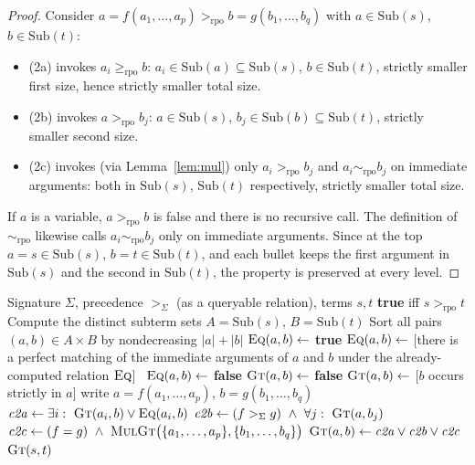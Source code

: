 \documentclass{amsart}
\theoremstyle{definition}
\theoremstyle{remark}
\newcommand{\rpo}{>_{\mathrm{rpo}}}
\newcommand{\rpoe}{\ge_{\mathrm{rpo}}}
\newcommand{\sig}{\Sigma}
\newcommand{\prc}{>_{\sig}}
\newcommand{\size}[1]{|#1|}
\begin{document}
\begin{proof}
Consider $a=f(a_1,\dots,a_p)\rpo b=g(b_1,\dots,b_q)$ with $a\in\mathrm{Sub}(s)$,
$b\in\mathrm{Sub}(t)$:
\begin{itemize}
\item (2a) invokes $a_i\rpoe b$: $a_i\in\mathrm{Sub}(a)\subseteq\mathrm{Sub}(s)$,
$b\in\mathrm{Sub}(t)$, strictly smaller first size, hence strictly smaller total
size.
\item (2b) invokes $a\rpo b_j$: $a\in\mathrm{Sub}(s)$,
$b_j\in\mathrm{Sub}(b)\subseteq\mathrm{Sub}(t)$, strictly smaller second size.
\item (2c) invokes (via Lemma~\ref{lem:mul}) only $a_i\rpo b_j$ and
$a_i\sim_{\mathrm{rpo}}b_j$ on immediate arguments: both in $\mathrm{Sub}(s)$,
$\mathrm{Sub}(t)$ respectively, strictly smaller total size.
\end{itemize}
If $a$ is a variable, $a\rpo b$ is false and there is no recursive call. The
definition of $\sim_{\mathrm{rpo}}$ likewise calls $a_i\sim_{\mathrm{rpo}}b_j$
only on immediate arguments. Since at the top $a=s\in\mathrm{Sub}(s)$,
$b=t\in\mathrm{Sub}(t)$, and each bullet keeps the first argument in
$\mathrm{Sub}(s)$ and the second in $\mathrm{Sub}(t)$, the property is preserved
at every level.
\end{proof}

\begin{algorithm}
\caption{{\sc RPO-Compare}: decide $s\rpo t$}
\begin{algorithmic}[1]
\Require Signature $\sig$, precedence $\prc$ (as a queryable relation), terms $s,t$
\Ensure \textbf{true} iff $s\rpo t$
\State Compute the distinct subterm sets $A=\mathrm{Sub}(s)$, $B=\mathrm{Sub}(t)$
\State Sort all pairs $(a,b)\in A\times B$ by nondecreasing $\size{a}+\size{b}$
  \State {}
   $\textsc{Eq}(a,b)\gets$ \textbf{true}
     \State $\textsc{Eq}(a,b)\gets$ [there is a perfect matching of the immediate
     arguments of $a$ and $b$ under the already-computed relation $\textsc{Eq}$]
  \Else\ $\textsc{Eq}(a,b)\gets$ \textbf{false}
  \EndIf
  \State \Comment{$\textsc{Gt}(a,b)=[a\rpo b]$}
   $\textsc{Gt}(a,b)\gets$ \textbf{false}
   $\textsc{Gt}(a,b)\gets$ [$b$ occurs strictly in $a$]
  \Else
     \State write $a=f(a_1,\dots,a_p)$, $b=g(b_1,\dots,b_q)$
     \State $\mathit{c2a}\gets \exists i:\ \textsc{Gt}(a_i,b)\lor\textsc{Eq}(a_i,b)$
     \State $\mathit{c2b}\gets (f\prc g)\ \wedge\ \forall j:\ \textsc{Gt}(a,b_j)$
     \State $\mathit{c2c}\gets (f=g)\ \wedge\ \textsc{MulGt}\bigl(\{a_1,\dots,a_p\},\{b_1,\dots,b_q\}\bigr)$
     \State $\textsc{Gt}(a,b)\gets \mathit{c2a}\lor \mathit{c2b}\lor \mathit{c2c}$
  \EndIf
\EndFor
\State \Return $\textsc{Gt}(s,t)$
\end{algorithmic}
\end{algorithm}
\end{document}
